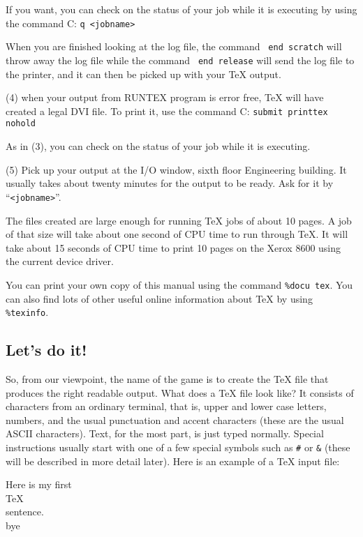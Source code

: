 If you want, you can check on the status of your job while it is 
executing by using the command 
\itemitem{} C: {\tt q <jobname>} 
 
When you are finished looking at the log file, the command {\tt 
end scratch} will throw away the log file while the command {\tt 
end release} will send the log file to the printer, and it can 
then be picked up with your \TeX{} output. 
 
\item{(4)} when your output from RUNTEX program is error free, \TeX{} 
will have created a legal DVI file.  To print it, use the 
command 
\itemitem{} C: {\tt submit printtex nohold} 
 
As in (3), you can check on the status of your job while it is 
executing. 
\item{(5)} Pick up your output at the I/O window, sixth floor 
Engineering building.  It usually takes about twenty minutes for the 
output to be ready.  Ask for it by ``{\tt <jobname>}''. 
 
The files created are large enough for running \TeX{} jobs of about 
10 pages.  A job of that size will take about one second of CPU time 
to run through \TeX\null.  It will take about 15 seconds of CPU time to 
print 10 pages on the Xerox 8600 using the current device driver. 
 
You can print your own copy of this manual using the command 
{\tt \%docu tex}. You can also find lots of other useful 
online information about \TeX{} by using {\tt \%texinfo}. 
 
\subsection{Let's do it!} 
 
So, from our viewpoint, the name of the game is to create the \TeX{} 
file that produces the right readable output. What does 
a \TeX{} file look like? It consists of characters from an 
ordinary terminal, that is, upper and lower case letters, 
numbers, and the usual punctuation and accent characters (these 
are the usual ASCII characters). Text, for the most part, is just 
typed normally. Special instructions usually start with one of a 
few special symbols such as {\tt \#} or {\tt \&} (these will be 
described in more detail later). Here is an example of a \TeX{} 
input file: 
 
\beginuser 
Here is my first \\TeX\\ sentence. 
\\bye 
\enduser 
{} \toindex{ } 
 
